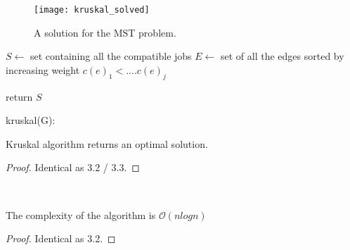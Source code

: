 \begin{figure}[H]
    \centering
    \texttt{[image: kruskal\_solved]}
    \caption{A solution for the MST problem.}
\end{figure}

\begin{algorithm}[H]
    \SetAlgoLined
    \small
    \BlankLine

    $S \leftarrow$ set containing all the compatible jobs\;
    $E \leftarrow$ set of all the edges sorted by increasing weight $c(e)_{1} < .... c(e)_{j}$

    \BlankLine


    \BlankLine

    return $S$\;
    \caption{kruskal(G):}
\end{algorithm}

\begin{claim}
    Kruskal algorithm returns an optimal solution.
\end{claim}
\begin{proof}
    Identical as 3.2 / 3.3.
\end{proof}\\

\begin{claim}
    The complexity of the algorithm is $\mathcal{O}{(nlogn)}$
\end{claim}
\begin{proof}
    Identical as 3.2.
\end{proof}\\

\clearpage

